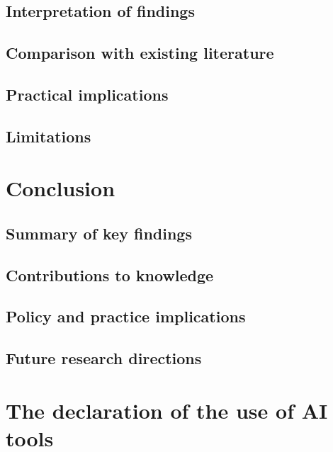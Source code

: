 \documentclass[12pt]{report}
\begin{document}
\section{Interpretation of findings}
\section{Comparison with existing literature}
\section{Practical implications}
\section{Limitations}


\chapter{Conclusion}

\section{Summary of key findings}
\section{Contributions to knowledge}
\section{Policy and practice implications}
\section{Future research directions}




\appendix
\chapter{The declaration of the use of AI tools}
\end{document}

